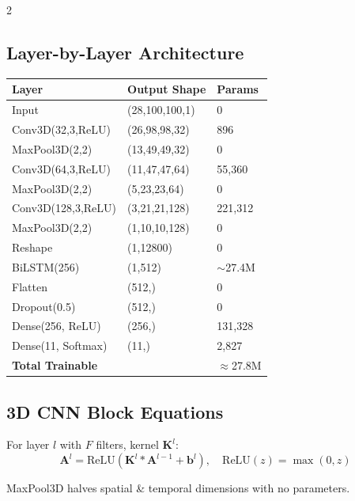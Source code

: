 \documentclass[10pt, a4paper]{article}
\begin{document}
\begin{multicols}{2}
\subsection{Layer-by-Layer Architecture}

\begin{center}
\scriptsize
\begin{tabular}{@{}p{3cm} p{2cm} p{1.5cm}@{}}
\toprule
\textbf{Layer} & \textbf{Output Shape} & \textbf{Params} \\
\midrule
Input              & (28,100,100,1)     & 0 \\
Conv3D(32,3,ReLU)  & (26,98,98,32)      & 896 \\
MaxPool3D(2,2)     & (13,49,49,32)      & 0 \\
Conv3D(64,3,ReLU)  & (11,47,47,64)      & 55,360 \\
MaxPool3D(2,2)     & (5,23,23,64)       & 0 \\
Conv3D(128,3,ReLU) & (3,21,21,128)      & 221,312 \\
MaxPool3D(2,2)     & (1,10,10,128)      & 0 \\
Reshape            & (1,12800)           & 0 \\
BiLSTM(256)        & (1,512)             & $\sim$27.4M \\
Flatten            & (512,)              & 0 \\
Dropout(0.5)       & (512,)              & 0 \\
Dense(256, ReLU)   & (256,)              & 131,328 \\
Dense(11, Softmax) & (11,)               & 2,827 \\
\midrule
\multicolumn{2}{l}{\textbf{Total Trainable}} & $\approx$27.8M \\
\bottomrule
\end{tabular}
\end{center}

\subsection{3D CNN Block Equations}

For layer $l$ with $F$ filters, kernel $\mathbf{K}^l$:
\begin{equation}
\mathbf{A}^l = \text{ReLU}\!\left(
  \mathbf{K}^l * \mathbf{A}^{l-1} + \mathbf{b}^l
\right), \quad \text{ReLU}(z) = \max(0,z)
\end{equation}

MaxPool3D halves spatial \& temporal dimensions with no parameters.


\end{multicols}
\end{document}
